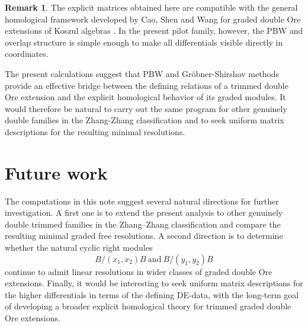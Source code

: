 \documentclass[reqno]{amsart}
\numberwithin{equation}{section}
\theoremstyle{definition}
\newtheorem{remark}[theorem]{Remark}
\begin{document}
\begin{remark}
The explicit matrices obtained here are compatible with the general homological framework developed by Cao, Shen and Wang for graded double Ore extensions of Koszul algebras \cite{CSW25}. In the present pilot family, however, the PBW and overlap structure is simple enough to make all differentials visible directly in coordinates.
\end{remark}

The present calculations suggest that PBW and Gr\"obner-Shirshov methods provide an effective bridge between the defining relations of a trimmed double Ore extension and the explicit homological behavior of its graded modules. It would therefore be natural to carry out the same program for other genuinely double families in the Zhang-Zhang classification and to seek uniform matrix descriptions for the resulting minimal resolutions.

\section{Future work}

The computations in this note suggest several natural directions for further investigation.
A first one is to extend the present analysis to other genuinely double trimmed families
in the Zhang--Zhang classification and compare the resulting minimal graded free resolutions.
A second direction is to determine whether the natural cyclic right modules
\[
B/(x_1,x_2)B
\ \text{and} \
B/(y_1,y_2)B
\]
continue to admit linear resolutions in wider classes of graded double Ore extensions.
Finally, it would be interesting to seek uniform matrix descriptions for the higher differentials
in terms of the defining DE-data, with the long-term goal of developing a broader explicit
homological theory for trimmed graded double Ore extensions.
\end{document}
